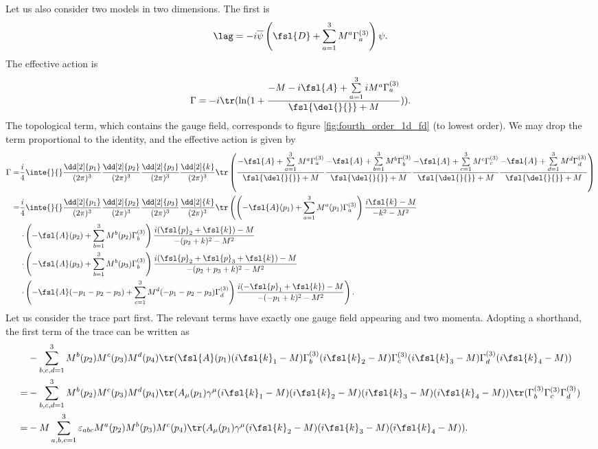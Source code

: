 Let us also consider two models in two dimensions. The first is
\begin{align*}
	\lag = -i\overline{\psi}\left(\fsl{D} + \sum\limits_{a = 1}^{3}M^{a}\Gamma_{a}^{(3)}\right)\psi.
\end{align*}
The effective action is
\begin{align*}
	\Gamma = -i\tr(\ln(1 + \frac{-M - i\fsl{A} + \sum\limits_{a = 1}^{3}iM^{a}\Gamma_{a}^{(3)}}{\fsl{\del{}{}} + M})).
\end{align*}
The topological term, which contains the gauge field, corresponds to figure \ref{fig:fourth_order_1d_fd} (to lowest order). We may drop the term proportional to the identity, and the effective action is given by
\begin{align*}
	\Gamma =& \frac{i}{4}\inte{}{}\frac{\dd[2]{p_{1}}}{(2\pi)^{3}}\frac{\dd[2]{p_{2}}}{(2\pi)^{3}}\frac{\dd[2]{p_{3}}}{(2\pi)^{3}}\frac{\dd[2]{k}}{(2\pi)^{3}}\tr\left(\frac{-\fsl{A} + \sum\limits_{a = 1}^{3}M^{a}\Gamma_{a}^{(3)}}{\fsl{\del{}{}} + M}\frac{-\fsl{A} + \sum\limits_{b = 1}^{3}M^{b}\Gamma_{b}^{(3)}}{\fsl{\del{}{}} + M}\frac{-\fsl{A} + \sum\limits_{c = 1}^{3}M^{c}\Gamma_{c}^{(3)}}{\fsl{\del{}{}} + M}\frac{-\fsl{A} + \sum\limits_{d = 1}^{3}M^{d}\Gamma_{d}^{(3)}}{\fsl{\del{}{}} + M}\right) \\
	=& \frac{i}{4}\inte{}{}\frac{\dd[2]{p_{1}}}{(2\pi)^{3}}\frac{\dd[2]{p_{2}}}{(2\pi)^{3}}\frac{\dd[2]{p_{3}}}{(2\pi)^{3}}\frac{\dd[2]{k}}{(2\pi)^{3}}\tr\left(\left(-\fsl{A}(p_{1}) + \sum\limits_{a = 1}^{3}M^{a}(p_{1})\Gamma_{a}^{(3)}\right)\frac{i\fsl{k} - M}{-k^{2} - M^{2}}\right. \\
	 &\left.\cdot\left(-\fsl{A}(p_{2}) + \sum\limits_{b = 1}^{3}M^{b}(p_{2})\Gamma_{b}^{(3)}\right)\frac{i(\fsl{p}_{2} + \fsl{k}) - M}{-(p_{2} + k)^{2} - M^{2}}\right. \\
	 &\left.\cdot\left(-\fsl{A}(p_{3}) + \sum\limits_{b = 1}^{3}M^{b}(p_{3})\Gamma_{b}^{(3)}\right)\frac{i(\fsl{p}_{2} + \fsl{p}_{3} + \fsl{k}) - M}{-(p_{2} + p_{3} + k)^{2} - M^{2}}\right. \\
	 &\left.\cdot\left(-\fsl{A}(-p_{1} - p_{2} - p_{3}) + \sum\limits_{c = 1}^{3}M^{d}(-p_{1} - p_{2} - p_{3})\Gamma_{d}^{(3)}\right)\frac{i(-\fsl{p}_{1} + \fsl{k}) - M}{-(-p_{1} + k)^{2} - M^{2}}\right).
\end{align*}
Let us consider the trace part first. The relevant terms have exactly one gauge field appearing and two momenta. Adopting a shorthand, the first term of the trace can be written as
\begin{align*}
	 &-\sum\limits_{b, c, d = 1}^{3}M^{b}(p_{2})M^{c}(p_{3})M^{d}(p_{4})\tr(\fsl{A}(p_{1})(i\fsl{k}_{1} - M)\Gamma_{b}^{(3)}(i\fsl{k}_{2} - M)\Gamma_{c}^{(3)}(i\fsl{k}_{3} - M)\Gamma_{d}^{(3)}(i\fsl{k}_{4} - M)) \\
	=& -\sum\limits_{b, c, d = 1}^{3}M^{b}(p_{2})M^{c}(p_{3})M^{d}(p_{4})\tr(A_{\mu}(p_{1})\gamma^{\mu}(i\fsl{k}_{1} - M)(i\fsl{k}_{2} - M)(i\fsl{k}_{3} - M)(i\fsl{k}_{4} - M))\tr(\Gamma_{b}^{(3)}\Gamma_{c}^{(3)}\Gamma_{d}^{(3)}) \\
	=& -M\sum\limits_{a, b, c = 1}^{3}\varepsilon_{abc}M^{a}(p_{2})M^{b}(p_{3})M^{c}(p_{4})\tr(A_{\mu}(p_{1})\gamma^{\mu}(i\fsl{k}_{2} - M)(i\fsl{k}_{3} - M)(i\fsl{k}_{4} - M)).
\end{align*}

